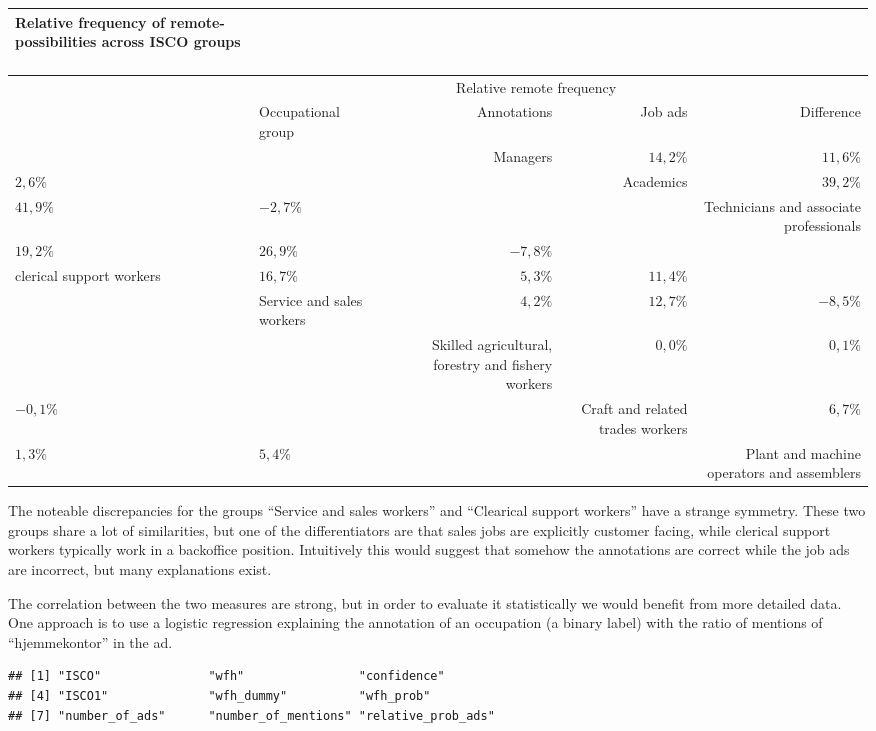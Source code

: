 \documentclass[]{article}
\begin{document}
\captionsetup[table]{labelformat=empty,skip=1pt}
\begin{longtable}{llrrr}
\caption*{
\large Relative frequency of remote-possibilities across ISCO groups\\ 
\small \\ 
} \\ 
\toprule
& & \multicolumn{2}{c}{Relative remote frequency} & \\ 
 \cmidrule(lr){3-4}
 & Occupational group & Annotations & Job ads & Difference \\ 
\midrule
 &  & Managers & $14,2\%$ & $11,6\%$ \\ 
$2,6\%$ &  &  & Academics & $39,2\%$ \\ 
$41,9\%$ & $-2,7\%$ &  &  & Technicians and associate professionals \\ 
$19,2\%$ & $26,9\%$ & $-7,8\%$ &  &  \\ 
clerical support workers & $16,7\%$ & $5,3\%$ & $11,4\%$ &  \\ 
 & Service and sales workers & $4,2\%$ & $12,7\%$ & $-8,5\%$ \\ 
 &  & Skilled agricultural, forestry and fishery workers & $0,0\%$ & $0,1\%$ \\ 
$-0,1\%$ &  &  & Craft and related trades workers & $6,7\%$ \\ 
$1,3\%$ & $5,4\%$ &  &  & Plant and machine operators and assemblers \\ 
\bottomrule
\end{longtable}

The noteable discrepancies for the groups ``Service and sales workers''
and ``Clearical support workers'' have a strange symmetry. These two
groups share a lot of similarities, but one of the differentiators are
that sales jobs are explicitly customer facing, while clerical support
workers typically work in a backoffice position. Intuitively this would
suggest that somehow the annotations are correct while the job ads are
incorrect, but many explanations exist.

The correlation between the two measures are strong, but in order to
evaluate it statistically we would benefit from more detailed data. One
approach is to use a logistic regression explaining the annotation of an
occupation (a binary label) with the ratio of mentions of
``hjemmekontor'' in the ad.

\begin{verbatim}
## [1] "ISCO"               "wfh"                "confidence"        
## [4] "ISCO1"              "wfh_dummy"          "wfh_prob"          
## [7] "number_of_ads"      "number_of_mentions" "relative_prob_ads"
\end{verbatim}
\end{document}
